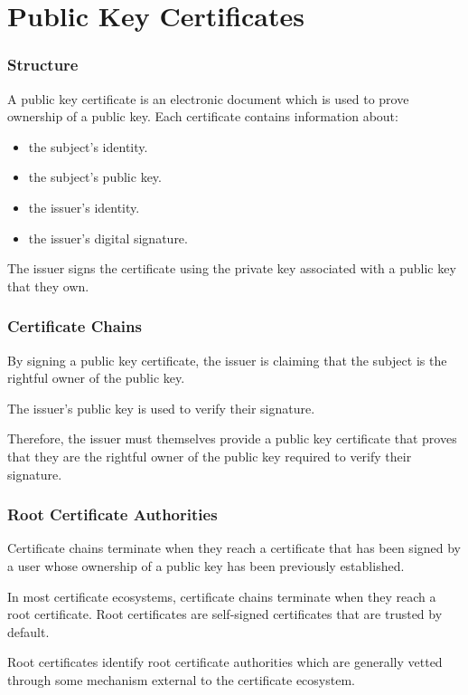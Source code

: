 \documentclass[aspectratio=169]{beamer}
\begin{document}
\section{Public Key Certificates}
\begin{frame}[Triangle=siiorange]
	\tocpage
\end{frame}

\begin{frame}[triangle=siiblue]
	\frametitle{Structure}
	A public key certificate is an electronic document which is used to prove ownership of a public key.  	Each certificate contains information about:
	\begin{itemize}
		\item the subject's identity.
		\item the subject's public key.
		\item the issuer's identity.
		\item the issuer's digital signature.
	\end{itemize}

	\vfill

	The issuer signs the certificate using the private key associated with a public key that they own.
\end{frame}

\begin{frame}[triangle=siiblue]
	\frametitle{Certificate Chains}
	By signing a public key certificate, the issuer is claiming that the subject is the rightful owner of the public key.
	
	\vfill
	
	The issuer's public key is used to verify their signature.  
	
	\vfill
	
	Therefore, the issuer must themselves provide a public key certificate that proves that they are the rightful owner of the public key required to verify their signature.
\end{frame}

\begin{frame}[triangle=siiblue]
	\frametitle{Root Certificate Authorities}
	Certificate chains terminate when they reach a certificate that has been signed by a user whose ownership of a public key has been previously established.
	
	\vfill
	
	In most certificate ecosystems, certificate chains terminate when they reach a root certificate. Root certificates are self-signed certificates that are trusted by default.
	
	\vfill
	
	Root certificates identify root certificate authorities which are generally vetted through some mechanism external to the certificate ecosystem. 
\end{frame}
\end{document}
